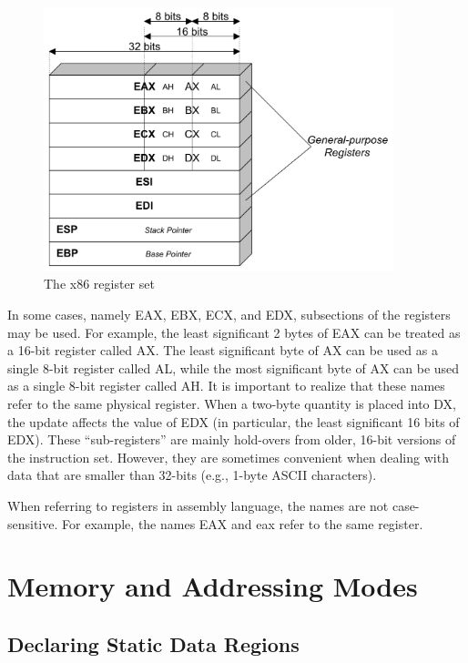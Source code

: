 \begin{figure}[h]
\begin{center}
\includegraphics[width=4in]{x86-32bit/x86-register-diagram.pdf}
\end{center}
\caption{The x86 register set}
\label{x86-register-diagram.fig}
\end{figure}

In some cases, namely EAX, EBX, ECX, and EDX, subsections of the
registers may be used.  For example, the least significant 2 bytes of
EAX can be treated as a 16-bit register called AX.  The least
significant byte of AX can be used as a single 8-bit register called
AL, while the most significant byte of AX can be used as a single
8-bit register called AH. It is important to realize that these names
refer to the same physical register. When a two-byte quantity is
placed into DX, the update affects the value of EDX (in particular,
the least significant 16 bits of EDX). These ``sub-registers''
are mainly hold-overs from older, 16-bit versions of the instruction
set. However, they are sometimes convenient when dealing with data
that are smaller than 32-bits (e.g., 1-byte ASCII characters).

When referring to registers in assembly language, the names are not
case-sensitive. For example, the names EAX and eax refer to the same
register.

\section{Memory and Addressing Modes}

\subsection{Declaring Static Data Regions}

